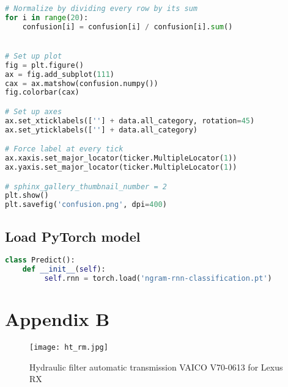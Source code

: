 \begin{appendices}
\begin{lstlisting}[language=Python,caption={Confusion matrix},label={code:confusion matrix}]
# Normalize by dividing every row by its sum
for i in range(20):
    confusion[i] = confusion[i] / confusion[i].sum()


# Set up plot
fig = plt.figure()
ax = fig.add_subplot(111)
cax = ax.matshow(confusion.numpy())
fig.colorbar(cax)

# Set up axes
ax.set_xticklabels([''] + data.all_category, rotation=45)
ax.set_yticklabels([''] + data.all_category)

# Force label at every tick
ax.xaxis.set_major_locator(ticker.MultipleLocator(1))
ax.yaxis.set_major_locator(ticker.MultipleLocator(1))

# sphinx_gallery_thumbnail_number = 2
plt.show()
plt.savefig('confusion.png', dpi=400)

\end{lstlisting}

\subsection*{Load PyTorch model}
\begin{lstlisting}[language=Python,caption={Load PyTorch model},label={code:Loadpt}]
class Predict():
    def __init__(self):
         self.rnn = torch.load('ngram-rnn-classification.pt')
        \end{lstlisting}
\clearpage
\section{Appendix B}
\begin{figure}[H]
    \centering    
    \texttt{[image: ht\_rm.jpg]}
    \caption{Hydraulic filter automatic transmission VAICO V70-0613 for Lexus RX \parencite{RM}}
    \label{fig:sparepart}
\end{figure}

\end{appendices}
